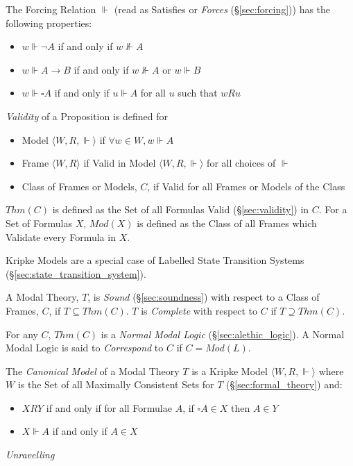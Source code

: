 The Forcing Relation $\Vdash$ (read as Satisfies or \emph{Forces}
(\S\ref{sec:forcing})) has the following properties:
\begin{itemize}
\item $w \Vdash \neg A$ if and only if $w \nVdash A$
\item $w \Vdash A \rightarrow B$ if and only if $w \nVdash A$ or $w
  \Vdash B$
\item $w \Vdash \square A$ if and only if $u \Vdash A$ for all $u$
  such that $w R u$
\end{itemize}
\emph{Validity} of a Proposition is defined for
\begin{itemize}
\item Model $\langle W,R, \Vdash \rangle$ if $\forall w \in W,
  w \Vdash A$
\item Frame $\langle W,R \rangle$ if Valid in Model $\langle W,R,
  \Vdash \rangle$ for all choices of $\Vdash$
\item Class of Frames or Models, $C$, if Valid for all Frames or
  Models of the Class
\end{itemize}
$Thm(C)$ is defined as the Set of all Formulas Valid
(\S\ref{sec:validity}) in $C$. For a Set of Formulas $X$,
$Mod(X)$ is defined as the Class of all Frames which Validate every
Formula in $X$.

Kripke Models are a special case of Labelled State Transition Systems
(\S\ref{sec:state_transition_system}).

A Modal Theory, $T$, is \emph{Sound} (\S\ref{sec:soundness}) with
respect to a Class of Frames, $C$, if $T \subseteq Thm(C)$. $T$ is
\emph{Complete} with respect to $C$ if $T \supseteq Thm(C)$.

For any $C$, $Thm(C)$ is a \emph{Normal Modal Logic}
(\S\ref{sec:alethic_logic}). A Normal Modal Logic is said to
\emph{Correspond} to $C$ if $C = Mod(L)$.

The \emph{Canonical Model} of a Modal Theory $T$ is a Kripke Model
$\langle W,R, \Vdash \rangle$ where $W$ is the Set of all Maximally
Consistent Sets for $T$ (\S\ref{sec:formal_theory}) and:
\begin{itemize}
\item $XRY$ if and only if for all Formulae $A$, if $\square A
  \in X$ then $A \in Y$
\item $X\Vdash A$ if and only if $A \in X$
\end{itemize}


\emph{Unravelling}

